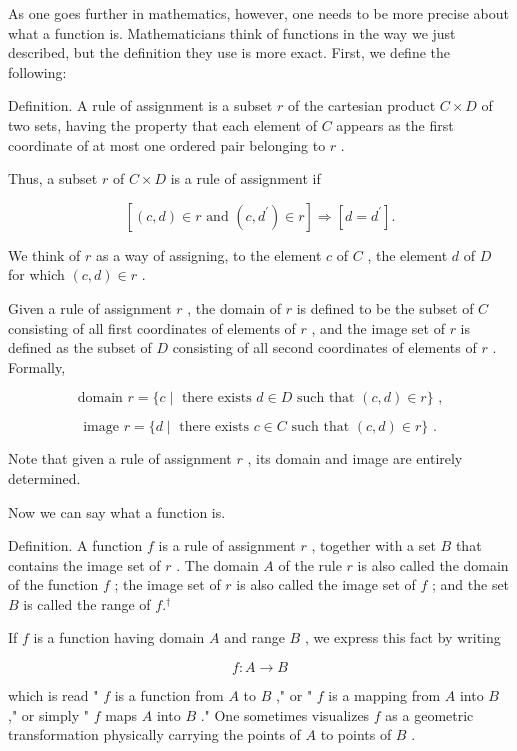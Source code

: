 \documentclass[10pt]{article}
\begin{document}
As one goes further in mathematics, however, one needs to be more precise about what a function is. Mathematicians think of functions in the way we just described, but the definition they use is more exact. First, we define the following:

Definition. A rule of assignment is a subset \(r\) of the cartesian product \(C \times  D\) of two sets, having the property that each element of \(C\) appears as the first coordinate of at most one ordered pair belonging to \(r\) .

Thus, a subset \(r\) of \(C \times  D\) is a rule of assignment if

\[
\left\lbrack  {\left( {c,d}\right)  \in  r\text{ and }\left( {c,{d}^{\prime }}\right)  \in  r}\right\rbrack   \Rightarrow  \left\lbrack  {d = {d}^{\prime }}\right\rbrack  .
\]

We think of \(r\) as a way of assigning, to the element \(c\) of \(C\) , the element \(d\) of \(D\) for which \(\left( {c,d}\right)  \in  r\) .

Given a rule of assignment \(r\) , the domain of \(r\) is defined to be the subset of \(C\) consisting of all first coordinates of elements of \(r\) , and the image set of \(r\) is defined as the subset of \(D\) consisting of all second coordinates of elements of \(r\) . Formally,

\[
\text{ domain }r = \{ c \mid  \text{ there exists }d \in  D\text{ such that }\left( {c,d}\right)  \in  r\} \text{ , }
\]

\[
\text{ image }r = \{ d \mid  \text{ there exists }c \in  C\text{ such that }\left( {c,d}\right)  \in  r\} \text{ . }
\]

Note that given a rule of assignment \(r\) , its domain and image are entirely determined.

Now we can say what a function is.

Definition. A function \(f\) is a rule of assignment \(r\) , together with a set \(B\) that contains the image set of \(r\) . The domain \(A\) of the rule \(r\) is also called the domain of the function \(f\) ; the image set of \(r\) is also called the image set of \(f\) ; and the set \(B\) is called the range of \(f{.}^{ \dagger  }\)

If \(f\) is a function having domain \(A\) and range \(B\) , we express this fact by writing

\[
f : A \rightarrow  B
\]

which is read " \(f\) is a function from \(A\) to \(B\) ," or " \(f\) is a mapping from \(A\) into \(B\) ," or simply " \(f\) maps \(A\) into \(B\) ." One sometimes visualizes \(f\) as a geometric transformation physically carrying the points of \(A\) to points of \(B\) .
\end{document}

